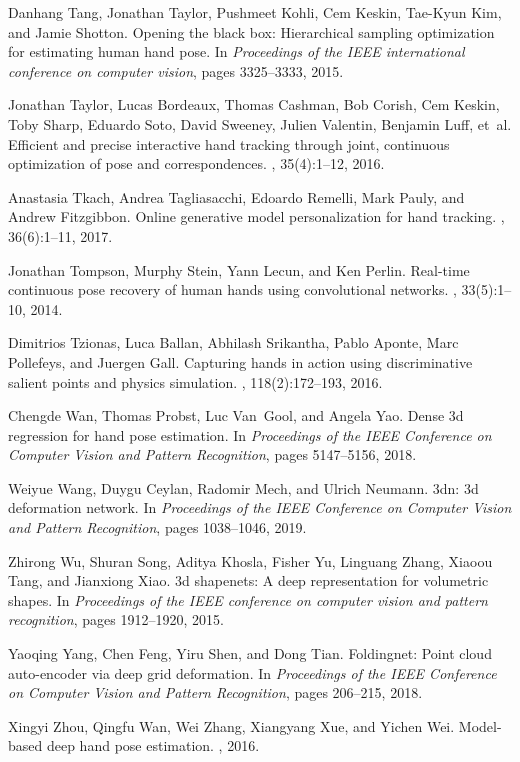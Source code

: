 \documentclass[10pt,twocolumn,letterpaper]{article}
\begin{document}
\begin{thebibliography}{10}
Danhang Tang, Jonathan Taylor, Pushmeet Kohli, Cem Keskin, Tae-Kyun Kim, and
  Jamie Shotton.
\newblock Opening the black box: Hierarchical sampling optimization for
  estimating human hand pose.
\newblock In {\em Proceedings of the IEEE international conference on computer
  vision}, pages 3325--3333, 2015.

Jonathan Taylor, Lucas Bordeaux, Thomas Cashman, Bob Corish, Cem Keskin, Toby
  Sharp, Eduardo Soto, David Sweeney, Julien Valentin, Benjamin Luff, et~al.
\newblock Efficient and precise interactive hand tracking through joint,
  continuous optimization of pose and correspondences.
, 35(4):1--12, 2016.

Anastasia Tkach, Andrea Tagliasacchi, Edoardo Remelli, Mark Pauly, and Andrew
  Fitzgibbon.
\newblock Online generative model personalization for hand tracking.
, 36(6):1--11, 2017.

Jonathan Tompson, Murphy Stein, Yann Lecun, and Ken Perlin.
\newblock Real-time continuous pose recovery of human hands using convolutional
  networks.
, 33(5):1--10, 2014.

Dimitrios Tzionas, Luca Ballan, Abhilash Srikantha, Pablo Aponte, Marc
  Pollefeys, and Juergen Gall.
\newblock Capturing hands in action using discriminative salient points and
  physics simulation.
, 118(2):172--193,
  2016.

Chengde Wan, Thomas Probst, Luc Van~Gool, and Angela Yao.
\newblock Dense 3d regression for hand pose estimation.
\newblock In {\em Proceedings of the IEEE Conference on Computer Vision and
  Pattern Recognition}, pages 5147--5156, 2018.

Weiyue Wang, Duygu Ceylan, Radomir Mech, and Ulrich Neumann.
\newblock 3dn: 3d deformation network.
\newblock In {\em Proceedings of the IEEE Conference on Computer Vision and
  Pattern Recognition}, pages 1038--1046, 2019.

Zhirong Wu, Shuran Song, Aditya Khosla, Fisher Yu, Linguang Zhang, Xiaoou Tang,
  and Jianxiong Xiao.
\newblock 3d shapenets: A deep representation for volumetric shapes.
\newblock In {\em Proceedings of the IEEE conference on computer vision and
  pattern recognition}, pages 1912--1920, 2015.

Yaoqing Yang, Chen Feng, Yiru Shen, and Dong Tian.
\newblock Foldingnet: Point cloud auto-encoder via deep grid deformation.
\newblock In {\em Proceedings of the IEEE Conference on Computer Vision and
  Pattern Recognition}, pages 206--215, 2018.

Xingyi Zhou, Qingfu Wan, Wei Zhang, Xiangyang Xue, and Yichen Wei.
\newblock Model-based deep hand pose estimation.
, 2016.

\end{thebibliography}
\end{document}
